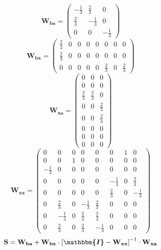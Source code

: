 \[ \mathbf{W_{ba}} = \left(\begin{array}{ccc} -\frac{1}{3} &
\frac{2}{3} & 0 \\ \frac{2}{3} & -\frac{1}{3} & 0 \\ 0 & 0 &
-\frac{1}{3} \end{array}\right) \]
\[ \mathbf{W_{bx}} = \left(\begin{array}{cccccccc} \frac{2}{3} & 0 & 0
& 0 & 0 & 0 & 0 & 0 \\ \frac{2}{3} & 0 & 0 & 0 & 0 & 0 & 0 & 0 \\ 0 &
0 & 0 & 0 & 0 & \frac{2}{3} & 0 & \frac{2}{3} \end{array}\right) \]
\[ \mathbf{W_{xa}} = \left(\begin{array}{ccc} 0 & 0 & 0 \\ 0 & 0 & 0
\\ \frac{2}{3} & \frac{2}{3} & 0 \\ 0 & 0 & \frac{2}{3} \\ 0 & 0 &
\frac{2}{3} \\ 0 & 0 & 0 \\ 0 & 0 & 0 \\ 0 & 0 & 0 \end{array}\right)
\]
\[ \mathbf{W_{xx}} = \left(\begin{array}{cccccccc} 0 & 0 & 0 & 0 & 0 &
0 & 1 & 0 \\ 0 & 0 & 1 & 0 & 0 & 0 & 0 & 0 \\ -\frac{1}{3} & 0 & 0 & 0
& 0 & 0 & 0 & 0 \\ 0 & 0 & 0 & 0 & 0 & -\frac{1}{3} & 0 & \frac{2}{3}
\\ 0 & 0 & 0 & 0 & 0 & \frac{2}{3} & 0 & -\frac{1}{3} \\ 0 &
\frac{2}{3} & 0 & -\frac{1}{3} & \frac{2}{3} & 0 & 0 & 0 \\ 0 &
-\frac{1}{3} & 0 & \frac{2}{3} & \frac{2}{3} & 0 & 0 & 0 \\ 0 &
\frac{2}{3} & 0 & \frac{2}{3} & -\frac{1}{3} & 0 & 0 & 0
\end{array}\right) \]
\[ \mathbf{S}=\mathbf{W_{ba}}+\mathbf{W_{bx}}\cdot\left[
\boldsymbol{\mathbbm{I}}
-\mathbf{W_{xx}}\right]^{-1}\cdot\mathbf{W_{xa}} \]
